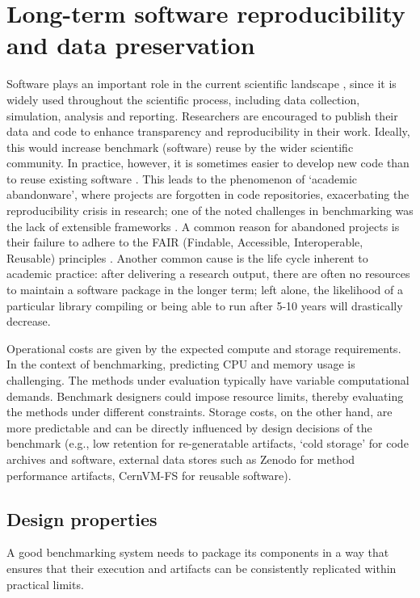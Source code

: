 \documentclass[11pt]{article}
\begin{document}
\section*{Long-term software reproducibility and data preservation}

Software plays an important role in the current scientific landscape \cite{Howison2015-rc}, since it is widely used throughout the scientific process, including data collection, simulation, analysis and reporting. Researchers are encouraged to publish their data and code to enhance transparency and reproducibility in their work. Ideally, this would increase benchmark (software) reuse by the wider scientific community. In practice, however, it is sometimes easier to develop new code than to reuse existing software \cite{Trisovic2022-ol}. This leads to the phenomenon of `academic abandonware', where projects are forgotten in code repositories, exacerbating the reproducibility crisis in research; one of the noted challenges in benchmarking was the lack of extensible frameworks \cite{Sonrel2023-te}. A common reason for abandoned projects is their failure to adhere to the FAIR (Findable, Accessible, Interoperable, Reusable) principles \cite{Wilkinson2016-bh}. Another common cause is the life cycle inherent to academic practice: after delivering a research output, there are often no resources to maintain a software package in the longer term; left alone, the likelihood of a particular library compiling or being able to run after 5-10 years will drastically decrease.

Operational costs are given by the expected compute and storage requirements. In the context of benchmarking, predicting CPU and memory usage is challenging. The methods under evaluation typically have variable computational demands. Benchmark designers could impose resource limits, thereby evaluating the methods under different constraints. Storage costs, on the other hand, are more predictable and can be directly influenced by design decisions of the benchmark (e.g., low retention for re-generatable artifacts, `cold storage' for code archives and software, external data stores such as Zenodo for method performance artifacts, CernVM-FS for reusable software).

\subsection*{Design properties}

A good benchmarking system needs to package its components in a way that ensures that their execution and artifacts can be consistently replicated within practical limits.
\end{document}
